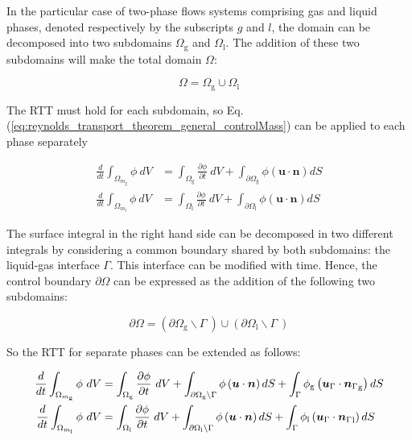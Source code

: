 In the particular case of two-phase flows systems comprising gas and liquid phases, denoted respectively by the subscripts $g$ and $l$, the domain can be decomposed into two subdomains $\Omega_\mathrm{g}$ and $\Omega_\mathrm{l}$. The addition of these two subdomains will make the total domain $\Omega$:

\begin{equation}
\label{eq:omega_domain_partition}
\Omega = \Omega_\mathrm{g} \cup \Omega_\mathrm{l}
\end{equation}

The RTT must hold for each subdomain, so Eq. (\ref{eq:reynolds_transport_theorem_general_controlMass}) can be applied to each phase separately

\begin{subequations}
\begin{align}
\frac{d}{dt} \int_{\Omega_{m_\mathrm{g}}} \phi ~ dV &=  \int_{\Omega_\mathrm{g}} \frac{\partial \phi}{\partial t} ~ dV + \int_{\partial \Omega_\mathrm{g}} \phi \left( \boldsymbol{u} \cdot \boldsymbol{n} \right) dS\\
\frac{d}{dt} \int_{\Omega_{m_\mathrm{l}}} \phi ~ dV &=  \int_{\Omega_\mathrm{l}} \frac{\partial \phi}{\partial t} ~ dV + \int_{\partial \Omega_\mathrm{l}} \phi \left( \boldsymbol{u} \cdot \boldsymbol{n} \right) dS
\end{align}
\end{subequations}

The surface integral in the right hand side can be decomposed in two different integrals by considering a common boundary shared by both subdomains: the liquid-gas interface $\Gamma$. This interface can be modified with time. Hence, the control boundary $\partial \Omega$ can be expressed as the addition of the following two subdomains:

\begin{equation}
\label{eq:partial_omega_boundaries_partition}
\partial \Omega = \left( \partial \Omega_\mathrm{g} \backslash \Gamma ~ \right) \cup \left( \partial \Omega_\mathrm{l} \backslash \Gamma ~ \right)
\end{equation}

So the RTT for separate phases can be extended as follows:


\begin{subequations}
\begin{align}
\frac{d}{dt} \int_{\Omega_{m_\mathrm{g}}} \phi ~ dV &=  \int_{\Omega_\mathrm{g}} \frac{\partial \phi}{\partial t} ~ dV + \int_{\partial \Omega_\mathrm{g} \backslash \Gamma} \phi \left( \boldsymbol{u} \cdot \boldsymbol{n} \right) dS + \int_{\Gamma} \phi_\mathrm{g} \left( \boldsymbol{u}_{\scriptsize{\Gamma}} \cdot {\boldsymbol{n}_{\scriptsize{\Gamma}}}_\mathrm{g} \right) dS \\
\frac{d}{dt} \int_{\Omega_{m_\mathrm{l}}} \phi ~ dV &=  \int_{\Omega_\mathrm{l}} \frac{\partial \phi}{\partial t} ~ dV + \int_{\partial \Omega_\mathrm{l} \backslash \Gamma} \phi \left( \boldsymbol{u} \cdot \boldsymbol{n} \right) dS + \int_{\Gamma} \phi_\mathrm{l} \left( \boldsymbol{u}_{\scriptsize{\Gamma}} \cdot {\boldsymbol{n}_{\scriptsize{\Gamma}}}_\mathrm{l} \right) dS
\end{align}
\end{subequations}

